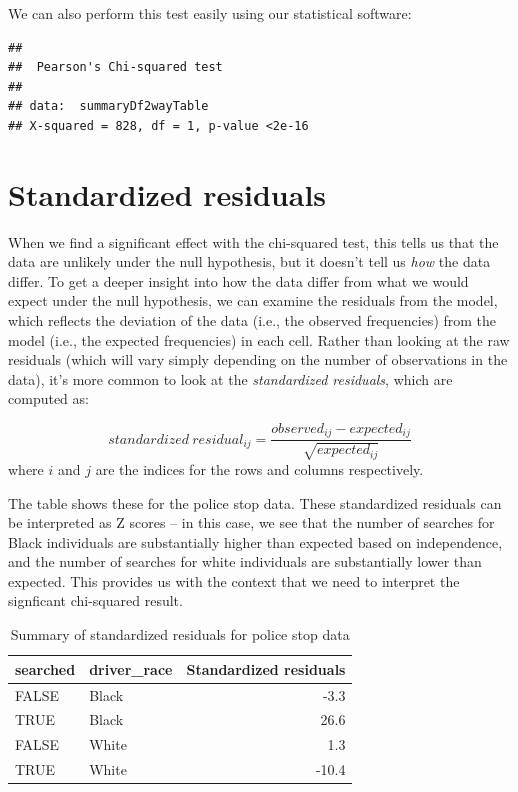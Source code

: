 \documentclass[12pt,]{book}
\theoremstyle{definition}
\theoremstyle{definition}
\theoremstyle{definition}
\theoremstyle{remark}
\begin{document}
We can also perform this test easily using our statistical software:

\begin{verbatim}
## 
##  Pearson's Chi-squared test
## 
## data:  summaryDf2wayTable
## X-squared = 828, df = 1, p-value <2e-16
\end{verbatim}

\hypertarget{standardized-residuals}{%
\section{Standardized residuals}\label{standardized-residuals}}

When we find a significant effect with the chi-squared test, this tells us that the data are unlikely under the null hypothesis, but it doesn't tell us \emph{how} the data differ. To get a deeper insight into how the data differ from what we would expect under the null hypothesis, we can examine the residuals from the model, which reflects the deviation of the data (i.e., the observed frequencies) from the model (i.e., the expected frequencies) in each cell. Rather than looking at the raw residuals (which will vary simply depending on the number of observations in the data), it's more common to look at the \emph{standardized residuals}, which are computed as:

\[
standardized\ residual_{ij} = \frac{observed_{ij} - expected_{ij}}{\sqrt{expected_{ij}}}
\]
where \(i\) and \(j\) are the indices for the rows and columns respectively.

The table shows these for the police stop data. These standardized residuals can be interpreted as Z scores -- in this case, we see that the number of searches for Black individuals are substantially higher than expected based on independence, and the number of searches for white individuals are substantially lower than expected. This provides us with the context that we need to interpret the signficant chi-squared result.

\begin{table}

\caption{\label{tab:unnamed-chunk-85}Summary of standardized residuals for police stop data}
\centering
\begin{tabular}[t]{l|l|r}
\hline
searched & driver\_race & Standardized residuals\\
\hline
FALSE & Black & -3.3\\
\hline
TRUE & Black & 26.6\\
\hline
FALSE & White & 1.3\\
\hline
TRUE & White & -10.4\\
\hline
\end{tabular}
\end{table}
\end{document}
